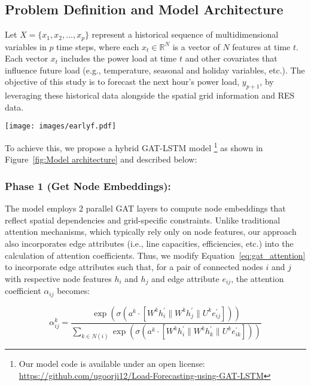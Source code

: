 \documentclass[sigconf,nonacm]{acmart}
\begin{document}
\subsection{Problem Definition and Model Architecture}

Let $X = \{x_1, x_2, \dots, x_p\}$ represent a historical sequence of multidimensional variables in $p$ time steps, where each $x_t \in \mathbb{R}^N$ is a vector of $N$ features at time $t$. Each vector $x_t$ includes the power load at time $t$ and other covariates that influence future load (e.g., temperature, seasonal and holiday variables, etc.). The objective of this study is to forecast the next hour's power load, $y_{p+1}$, by leveraging these historical data alongside the spatial grid information and RES data.

\begin{figure*}[h!]
    \centering
    \texttt{[image: images/earlyf.pdf]}
    \caption{Model Architecture}
    \label{fig:Model architecture}
\end{figure*}


To achieve this, we propose a hybrid GAT-LSTM model \footnote{Our model code is available under an open license: \url{https://github.com/ugoorji12/Load-Forecasting-using-GAT-LSTM}} as shown in Figure~\ref{fig:Model architecture} and described below:
\subsubsection*{\textbf{Phase 1 (Get Node Embeddings):}} The model employs 2 parallel GAT layers to compute node embeddings that reflect spatial dependencies and grid-specific constraints. Unlike traditional attention mechanisms, which typically rely only on node features, our approach also incorporates edge attributes (i.e., line capacities, efficiencies, etc.) into the calculation of attention coefficients. Thus, we modify Equation~\ref{eq:gat_attention} to incorporate edge attributes such that, for a pair of connected nodes $i$ and $j$ with respective node features $h_i$ and $h_j$ and edge attribute $e_{ij}$, the attention coefficient $\alpha_{ij}$ becomes:

\begin{equation}
\alpha_{ij}^k = \frac{\exp\left(\sigma\left(a^k \cdot [W^k h_i^{'} \parallel W^k h_j^{'} \parallel U^k e_{ij}^{'}] \right)\right)}{\sum_{k \in N(i)} \exp\left(\sigma\left(a^k \cdot [W^k h_i^{'} \parallel W^k h_k^{'} \parallel U^k e_{ik}^{'}]\right)\right)} 
\label{eq:attention_edge}
\end{equation}
\end{document}
